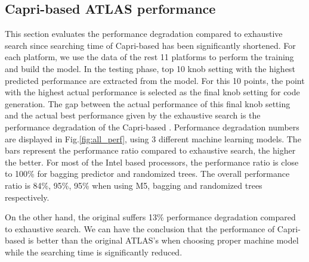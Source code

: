   \subsection{Capri-based ATLAS performance}
  \label{sec:capri_atlas_performance}
  This section evaluates the performance degradation compared to exhaustive
  search since searching time of Capri-based \atl has been significantly
  shortened. For each platform, we use the data of the rest 11 platforms to
  perform the training and build the model. In the testing phase, top 10
  knob setting with the highest predicted performance are extracted from the
  model. For this 10 points, the point with the highest actual performance is
  selected as the final knob setting for code generation. The gap between the
  actual performance of this final knob setting and the actual best performance
  given by the exhaustive search is the performance degradation of the
  Capri-based \atl. Performance degradation numbers are displayed in
  Fig.\ref{fig:all_perf}, using 3 different machine learning models. The bars
  represent the performance ratio compared to exhaustive search, the higher
  the better. For most of the Intel based processors, the performance ratio is
  close to 100\% for bagging predictor and randomized trees. The overall
  performance ratio is 84\%, 95\%, 95\% when using M5, bagging and randomized
  trees respectively.

  On the other hand, the original \atl suffers 13\% performance degradation
  compared to exhaustive search. We can have the conclusion that the
  performance of Capri-based \atl is better than the original ATLAS's when
  choosing proper machine model while the searching time is significantly
  reduced.

